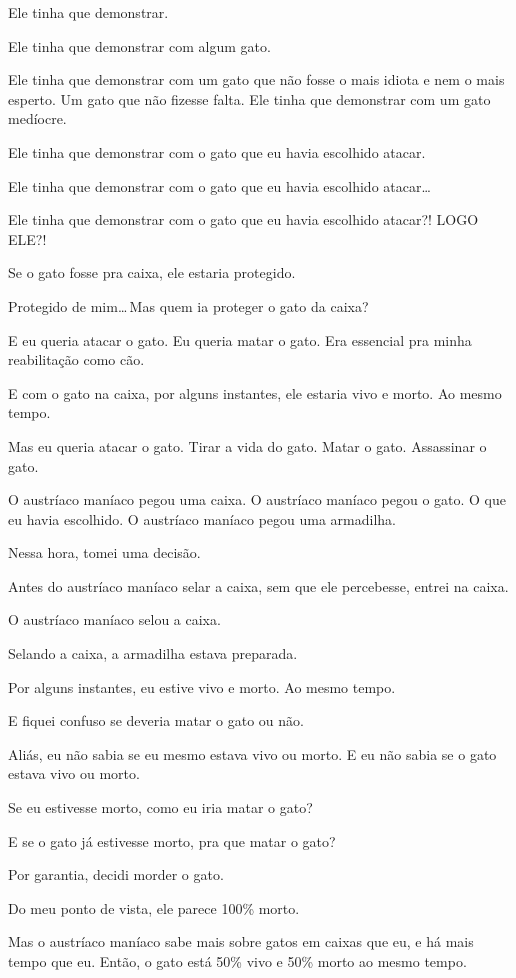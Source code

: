 Ele tinha que demonstrar.

Ele tinha que demonstrar com algum gato.

Ele tinha que demonstrar com um gato que não fosse o mais idiota e nem o mais esperto. Um gato que não fizesse falta. Ele tinha que demonstrar com um gato medíocre.

Ele tinha que demonstrar com o gato que eu havia escolhido atacar.

Ele tinha que demonstrar com o gato que eu havia escolhido atacar\ldots

Ele tinha que demonstrar com o gato que eu havia escolhido atacar?! LOGO ELE?!

Se o gato fosse pra caixa, ele estaria protegido.

Protegido de mim\ldots\,Mas quem ia proteger o gato da caixa?

E eu queria atacar o gato. Eu queria matar o gato. Era essencial pra minha reabilitação como cão.

E com o gato na caixa, por alguns instantes, ele estaria vivo e morto. Ao mesmo tempo.

Mas eu queria atacar o gato. Tirar a vida do gato. Matar o gato. Assassinar o gato.

O austríaco maníaco pegou uma caixa. O austríaco maníaco pegou o gato. O que eu havia escolhido. O austríaco maníaco pegou uma armadilha.

Nessa hora, tomei uma decisão.

Antes do austríaco maníaco selar a caixa, sem que ele percebesse, entrei na caixa.

O austríaco maníaco selou a caixa.

Selando a caixa, a armadilha estava preparada.

Por alguns instantes, eu estive vivo e morto. Ao mesmo tempo.

E fiquei confuso se deveria matar o gato ou não.

Aliás, eu não sabia se eu mesmo estava vivo ou morto. E eu não sabia se o gato estava vivo ou morto.

Se eu estivesse morto, como eu iria matar o gato?

E se o gato já estivesse morto, pra que matar o gato?

Por garantia, decidi morder o gato.

Do meu ponto de vista, ele parece 100\% morto.

Mas o austríaco maníaco sabe mais sobre gatos em caixas que eu, e há mais tempo que eu. Então, o gato está 50\% vivo e 50\% morto ao mesmo tempo.

